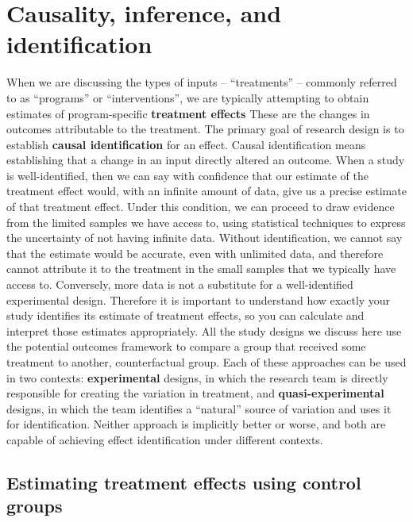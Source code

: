 \section{Causality, inference, and identification}

When we are discussing the types of inputs -- ``treatments'' -- commonly referred to as
``programs'' or ``interventions'', we are typically attempting to obtain estimates
of program-specific \textbf{treatment effects}
These are the changes in outcomes attributable to the treatment.\cite{abadie2018econometric}
The primary goal of research design is to establish \textbf{causal identification} for an effect.
Causal identification means establishing that a change in an input directly altered an outcome.
When a study is well-identified, then we can say with confidence
that our estimate of the treatment effect would,
with an infinite amount of data,
give us a precise estimate of that treatment effect.
Under this condition, we can proceed to draw evidence from the limited samples we have access to,
using statistical techniques to express the uncertainty of not having infinite data.
Without identification, we cannot say that the estimate would be accurate,
even with unlimited data, and therefore cannot attribute it to the treatment
in the small samples that we typically have access to.
Conversely, more data is not a substitute for a well-identified experimental design.
Therefore it is important to understand how exactly your study
identifies its estimate of treatment effects,
so you can calculate and interpret those estimates appropriately.
All the study designs we discuss here use the potential outcomes framework\cite{athey2017state}
to compare a group that received some treatment to another, counterfactual group.
Each of these approaches can be used in two contexts:
\textbf{experimental} designs, in which the research team
is directly responsible for creating the variation in treatment,
and \textbf{quasi-experimental} designs, in which the team
identifies a ``natural'' source of variation and uses it for identification.
Neither approach is implicitly better or worse,
and both are capable of achieving effect identification under different contexts.

\subsection{Estimating treatment effects using control groups}

